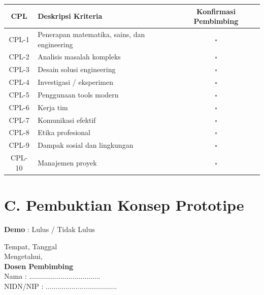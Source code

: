 \begin{longtable}{|c|p{10cm}|c|}
\hline
\centering
\textbf{CPL} & 
\centering 
\textbf{Deskripsi Kriteria} & \textbf{Konfirmasi Pembimbing} \\ \hline
CPL-1 & Penerapan matematika, sains, dan engineering & $\square$ \\ \hline
CPL-2 & Analisis masalah kompleks & $\square$ \\ \hline
CPL-3 & Desain solusi engineering & $\square$ \\ \hline
CPL-4 & Investigasi / eksperimen & $\square$ \\ \hline
CPL-5 & Penggunaan tools modern & $\square$ \\ \hline
CPL-6 & Kerja tim & $\square$ \\ \hline
CPL-7 & Komunikasi efektif & $\square$ \\ \hline
CPL-8 & Etika profesional & $\square$ \\ \hline
CPL-9 & Dampak sosial dan lingkungan & $\square$ \\ \hline
CPL-10 & Manajemen proyek & $\square$ \\ \hline
\end{longtable}

\section*{C. Pembuktian Konsep Prototipe}
\textbf{Demo} : Lulus / Tidak Lulus



\begin{flushright}
Tempat, Tanggal\\[0.2cm]
\vspace{0.2cm}
Mengetahui, \\[0.2cm]
\textbf{Dosen Pembimbing} \\[2cm]

Nama : .................................... \\[0.2cm]
NIDN/NIP : ....................................
\end{flushright}